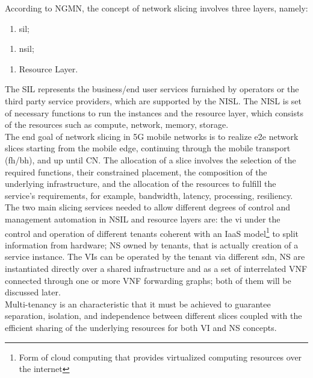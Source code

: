 \documentclass[a4paper,12pt]{report} %
\begin{document}
According to NGMN, the concept of network slicing involves three layers,
namely:
\begin{enumerate}[1]
\item \gls{sil};
\end{enumerate}
\begin{enumerate}[2]
\item \gls{nsil};
\end{enumerate}
\begin{enumerate}[3]
\item Resource Layer.
\end{enumerate}
The SIL represents the business/end user services furnished by operators or the third party service providers, which are supported by the NISL. The NISL is set of necessary functions to run the instances and the resource layer, which consists of the
resources such as compute, network, memory, storage.\\
The end goal of network slicing in 5G mobile networks is to realize
\gls{e2e} network slices starting from the mobile edge, continuing
through the mobile transport (\gls{fh}/\gls{bh}), and up until
\gls{CN}. The allocation of a slice involves the selection of the
required functions, their constrained placement, the composition of the underlying infrastructure, and the allocation of the resources to fulfill the service's requirements, for example, bandwidth, latency, processing, resiliency.\\
The two main slicing services needed to allow different degrees
of control and management automation in NSIL and resource layers are: the \gls{vi} under the control and operation
of different tenants coherent with an \gls{IaaS} model\footnote{Form of cloud computing that provides virtualized computing resources over the internet} to split information from hardware; \gls{NS} owned by tenants, that is actually creation of a service instance.
The VIs can be operated by the tenant via different \gls{sdn}, NS are instantiated directly over a shared infrastructure
and as a set of interrelated \gls{VNF} connected through
one or more VNF forwarding graphs; both of them will be discussed later.\\
Multi-tenancy is an characteristic that it must be achieved to guarantee separation, isolation, and independence between
different slices coupled with the efficient sharing of the underlying resources
for both VI and NS concepts.\\
\end{document}
